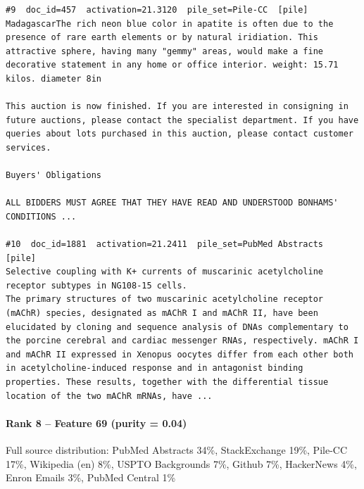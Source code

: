 \begin{verbatim}
#9  doc_id=457  activation=21.3120  pile_set=Pile-CC  [pile]
MadagascarThe rich neon blue color in apatite is often due to the presence of rare earth elements or by natural iridiation. This attractive sphere, having many "gemmy" areas, would make a fine decorative statement in any home or office interior. weight: 15.71 kilos. diameter 8in

This auction is now finished. If you are interested in consigning in future auctions, please contact the specialist department. If you have queries about lots purchased in this auction, please contact customer services.

Buyers' Obligations

ALL BIDDERS MUST AGREE THAT THEY HAVE READ AND UNDERSTOOD BONHAMS' CONDITIONS ...

#10  doc_id=1881  activation=21.2411  pile_set=PubMed Abstracts  [pile]
Selective coupling with K+ currents of muscarinic acetylcholine receptor subtypes in NG108-15 cells.
The primary structures of two muscarinic acetylcholine receptor (mAChR) species, designated as mAChR I and mAChR II, have been elucidated by cloning and sequence analysis of DNAs complementary to the porcine cerebral and cardiac messenger RNAs, respectively. mAChR I and mAChR II expressed in Xenopus oocytes differ from each other both in acetylcholine-induced response and in antagonist binding properties. These results, together with the differential tissue location of the two mAChR mRNAs, have ...

\end{verbatim}

\paragraph*{Rank 8 -- Feature 69 (purity = 0.04)}

Full source distribution: PubMed Abstracts 34\%, StackExchange 19\%, Pile-CC 17\%, Wikipedia (en) 8\%, USPTO Backgrounds 7\%, Github 7\%, HackerNews 4\%, Enron Emails 3\%, PubMed Central 1\%

